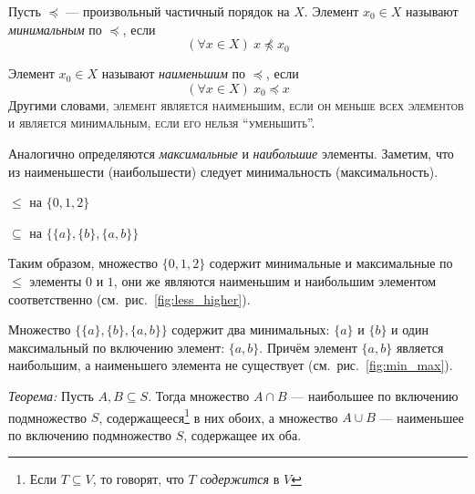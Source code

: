 Пусть $\preceq$ --- произвольный частичный порядок на $X$.
Элемент $x_0\in X$ называют {\it минимальным} по $\preceq$, если
\[
	(\forall x\in X)~x\npreceq x_0
\]

Элемент $x_0\in X$ называют {\it наименьшим} по $\preceq$, если
\[
	(\forall x\in X)~x_0\preceq x
\]
Другими словами, \textsc{элемент является наименьшим,
	если он меньше всех элементов и является минимальным, если его нельзя
	``уменьшить''.}

Аналогично определяются {\it максимальные} и {\it наибольшие} элементы.
Заметим, что из наименьшести (наибольшести) следует минимальность (максимальность).

\begin{marginfigure}
	\center

	\caption{$\leq$ на $\{0,1,2\}$}\label{fig:less_higher}
\end{marginfigure}

\begin{marginfigure}
	\center

	\caption{$\subseteq$ на $\{\{a\},\{b\},\{a,b\}\}$}\label{fig:min_max}
\end{marginfigure}

Таким образом, множество $\{0,1,2\}$ содержит минимальные и максимальные по $\leq$
элементы $0$ и $1$, они же являются наименьшим и
наибольшим элементом соответственно (см.~рис.~\ref{fig:less_higher}).

Множество $\{\{a\},\{b\},\{a,b\}\}$ содержит
два минимальных: $\{a\}$ и $\{b\}$ и один максимальный
по включению элемент: $\{a,b\}$. Причём элемент $\{a,b\}$ является наибольшим, а
наименьшего элемента не существует (см.~рис.~\ref{fig:min_max}).

\pagebreak
{\it Теорема:} Пусть $A,B\subseteq S$. Тогда множество $A\cap B$ ---
наибольшее по включению подмножество $S$, содержащееся\footnote{Если $T\subseteq V$,
	то говорят, что $T$ {\it содержится} в $V$} в них обоих,
а множество $A\cup B$ --- наименьшее по включению подмножество $S$,
содержащее их оба.

